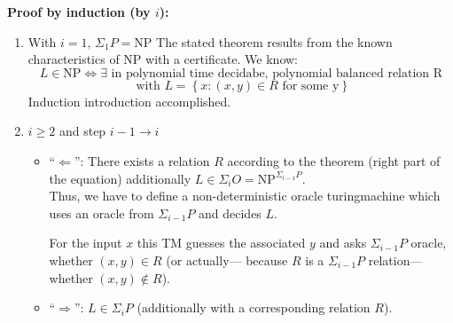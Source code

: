 \documentclass[a4paper]{article}
\newcommand{\set}[1]{\left\{#1\right\}}
\begin{document}
\textbf{Proof by induction (by $i$):}
\begin{enumerate}
  \item
    With $i=1$, $\Sigma_1 P = \text{NP}$
    The stated theorem results from the known characteristics
    of $\text{NP}$ with a certificate. We know:
    \[
      L \in \text{NP} \Leftrightarrow \exists
      \text{ in polynomial time decidabe, polynomial balanced relation R}
    \] \[
      \text{ with } L = \set{x: (x, y) \in R \text{ for some y}}
    \]
    Induction introduction accomplished.
  \item
    $i \geq 2$ and step $i - 1 \to i$
    \begin{itemize}
      \item
        ``$\Leftarrow$'': There exists a relation $R$ according
        to the theorem (right part of the equation) additionally
        $L \in \Sigma_i O = \text{NP}^{\Sigma_{i-1} P}$. \\
        Thus, we have to define a non-deterministic oracle turingmachine
        which uses an oracle from $\Sigma_{i-1} P$ and decides $L$.

        For the input $x$ this TM guesses the associated $y$ and asks
        $\Sigma_{i-1} P$ oracle, whether $(x, y) \in R$ (or actually---
        because $R$ is a $\Sigma_{i-1} P$ relation---whether $(x, y) \notin R$).
      \item
        ``$\Rightarrow$'': $L \in \Sigma_i P$ (additionally with a
        corresponding relation $R$).


\end{itemize}
\end{enumerate}
\end{document}
